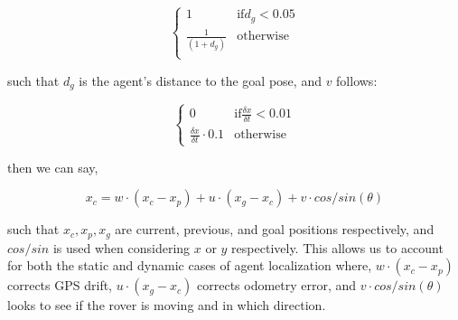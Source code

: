 \[
\begin{cases}
	1 & \text{if} d_g < 0.05 \\
	\frac{1}{(1 + d_g)} & \text{otherwise} \\
\end{cases}
\]

such that $d_g$ is the agent's distance to the goal pose, and $v$ follows:

\[
\begin{cases}
	0 & \text{if} \frac{\delta x}{\delta t} < 0.01 \\
	\frac{\delta x}{\delta t} \cdot 0.1 & \text{otherwise}
\end{cases}
\]

then we can say, 

\begin{equation}
	x_c = w \cdot (x_c - x_p) + u \cdot (x_g - x_c) + v \cdot cos/sin(\theta)
	\label{eq:dy_local}
\end{equation}

such that $x_c, x_p, x_g$ are current, previous, and goal positions respectively, and $cos/sin$ is used when considering $x$ or $y$ respectively. This allows us to account for both the static and dynamic cases of agent localization where, $w \cdot (x_c - x_p)$ corrects GPS drift, $u \cdot (x_g - x_c)$ corrects odometry error, and $v \cdot cos/sin(\theta)$ looks to see if the rover is moving and in which direction.
